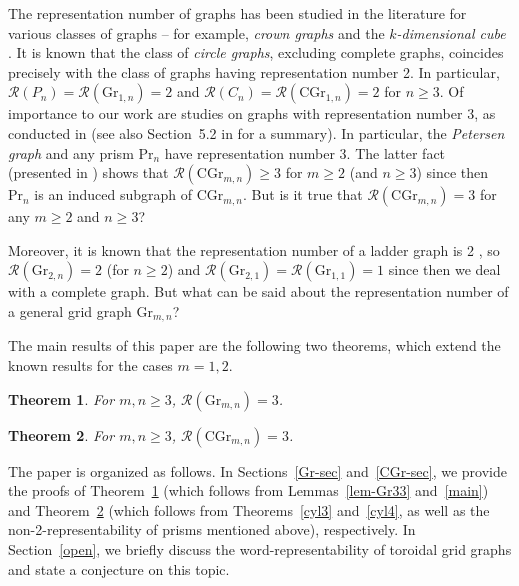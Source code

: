 \documentclass[11pt]{article}
\newtheorem{theorem}{Theorem}
\begin{document}
The representation number of graphs has been studied in the literature for various classes of graphs -- for example,  {\em crown graphs} \cite{GKP18,HHMO24} and the {\em $k$-dimensional cube} \cite{Bro18,BroZan19,HHMO24}. It is known \cite{KL15,KP18} that the class of {\em circle graphs}, excluding complete graphs, coincides precisely with the class of graphs having representation number 2. In particular, $\mathcal{R}(P_n)=\mathcal{R}(\mbox{Gr}_{1,n})=2$ and $\mathcal{R}(C_n)=\mathcal{R}(\mbox{CGr}_{1,n})=2$ for $n\geq 3$. Of importance to our work are studies on graphs with representation number 3, as conducted in \cite{Kit13,KitPya08} (see also Section~5.2 in \cite{KL15} for a summary). In particular,  the {\em Petersen graph} and any prism $\mbox{Pr}_n$ have representation number 3. The latter fact (presented in \cite{KitPya08}) shows that $\mathcal{R}(\mbox{CGr}_{m,n})\geq 3$ for $m\geq 2$ (and $n\geq 3$) since then $\mbox{Pr}_n$ is an induced subgraph of $\mbox{CGr}_{m,n}$. But is it true that  $\mathcal{R}(\mbox{CGr}_{m,n})=3$ for any $m\geq 2$ and $n\geq 3$?


Moreover, it is known that the representation number of a ladder graph is 2 \cite{Kit13},  so $\mathcal{R}(\mbox{Gr}_{2,n})=2$ (for $n\geq 2$) and  $\mathcal{R}(\mbox{Gr}_{2,1})=\mathcal{R}(\mbox{Gr}_{1,1})=1$ since then we deal with a complete graph. But what can be said about the representation number of a general grid graph $\mbox{Gr}_{m,n}$? 

The main results of this paper are the following two theorems, which extend the known results for the cases $m = 1, 2$.

\begin{theorem}\label{main1}  For $m,n\ge 3$, $\mathcal{R}(\mbox{Gr}_{m,n})=3$.\end{theorem}

\begin{theorem}\label{main2}  For $m,n\ge 3$, $\mathcal{R}(\mbox{CGr}_{m,n})=3$.\end{theorem}

The paper is organized as follows. In Sections~\ref{Gr-sec} and~\ref{CGr-sec}, we provide the proofs of Theorem~\ref{main1} (which follows from Lemmas~\ref{lem-Gr33} and~\ref{main}) and Theorem~\ref{main2} (which follows from Theorems~\ref{cyl3} and~\ref{cyl4}, as well as the non-2-representability of prisms mentioned above), respectively. In Section~\ref{open}, we briefly discuss the word-representability of toroidal grid graphs and state a conjecture on this topic.
\end{document}
